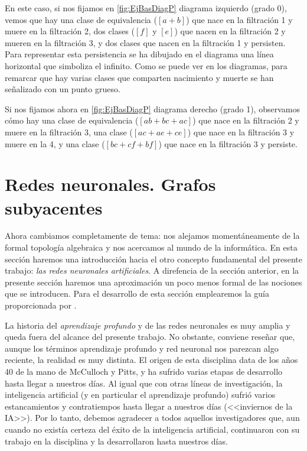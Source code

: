 \documentclass[12pt, a4paper, twoside]{book}
\numberwithin{equation}{section}
\theoremstyle{definition}
\newenvironment{ejem}
  {\pushQED{\qed}\renewcommand{\qedsymbol}{$\blacktriangleleft$}\ejemplo}
  {\popQED\endejemplo}
\theoremstyle{remark}
\theoremstyle{plain}
\begin{document}
\begin{ejem}
	En este caso, si nos fijamos en \autoref{fig:EjBasDiagP} 
	diagrama izquierdo (grado 0), vemos
	que hay una clase de equivalencia ($[a+b]$) que nace en la 
	filtración 1 y muere en la filtración 2, dos clases ($[f]$ y $[e]$) 
	que 
	nacen en la filtración 2 y mueren en la filtración 3, y dos clases que
	nacen en la filtración 1 y persisten. Para representar esta 
	persistencia se ha dibujado en el diagrama una línea horizontal que 
	simboliza el infinito. Como se puede ver en los diagramas, para 
	remarcar que hay varias clases que comparten nacimiento y muerte se 
	han señalizado con un punto grueso.

	Si nos fijamos ahora en \autoref{fig:EjBasDiagP} diagrama 
	derecho (grado 1), observamos cómo
	hay una clase de equivalencia ($[ab+bc+ac]$) que nace en la filtración 
	2
	y muere en la filtración 3, una clase ($[ac+ae+ce]$) que nace en la 
	filtración 3 y muere en la 4, y una clase ($[bc+cf+bf]$) que nace en 
	la 
	filtración 3 y persiste.

	\end{ejem}

	\section{Redes neuronales. Grafos subyacentes}
	
	Ahora cambiamos completamente de tema: nos alejamos momentáneamente de 
	la formal topología algebraica y nos acercamos al mundo 
	de la informática. En esta sección haremos una
	introducción hacia el otro concepto fundamental del presente trabajo: 
	\emph{las redes neuronales artificiales}. A direfencia de la sección 
	anterior, en la presente sección haremos una aproximación un poco menos 
	formal de las nociones que se introducen. Para el desarrollo de esta 
	sección emplearemos la guía proporcionada por 
	\cite{Goodfellow-et-al-2016,IA-Jonathan,MDiscreta-Guti}.

	La historia del \emph{aprendizaje profundo} y de las redes neuronales 
	es muy amplia y queda fuera del alcance del presente trabajo. No 
	obstante, conviene reseñar que, aunque los términos aprendizaje 
	profundo y red neuronal nos parezcan algo reciente, la realidad es muy
	distinta. El origen de esta disciplina data de los años 40 de la mano
	de McCulloch y Pitts, y ha sufrido varias etapas de desarrollo hasta 
	llegar a nuestros días. Al igual que con otras líneas de 
	investigación, la inteligencia artificial (y en particular el 
	aprendizaje profundo) sufrió varios estancamientos y contratiempos 
	hasta llegar a nuestros días (<<inviernos de la IA>>). Por lo tanto, 
	debemos agradecer a todos aquellos investigadores que, aun cuando no 
	existía certeza del éxito de la inteligencia artificial, continuaron 
	con su trabajo en la disciplina y la desarrollaron hasta nuestros 
	días.
\end{document}
